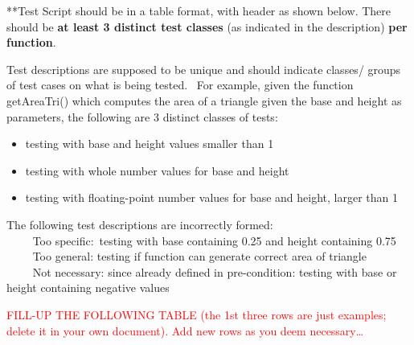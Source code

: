 \documentclass[10pt, letterpaper]{article}
\begin{document}
\begin{flushleft}
    **Test Script should be in a table format, with header as shown below.
    There should be \textbf{at least 3 distinct test classes} (as indicated in
    the description) \textbf{per function}.
\end{flushleft}

\begin{flushleft}
    Test descriptions are supposed to be unique and should indicate classes/
    groups of test cases on what is being tested.  For example, given the 
    function getAreaTri() which computes the area of a triangle given the base
    and height as parameters, the following are 3 distinct classes of tests:
\end{flushleft}

\begin{itemize}[itemsep=-0.2em]
    \item testing with base and height values smaller than 1
    \item testing with whole number values for base and height
    \item testing with floating-point number values for base and height, larger
          than 1
\end{itemize}

\begin{flushleft}
    The following test descriptions are incorrectly formed:\\
          Too specific: testing with base containing 0.25 and height containing
                        0.75\\
          Too general: testing if function can generate correct area of
                       triangle\\
          Not necessary: since already defined in pre-condition: testing with
                         base or height containing negative values
\end{flushleft}

\begin{flushleft}
    \textcolor{red} {
        FILL-UP THE FOLLOWING TABLE (the 1st three rows are just examples; delete
        it in your own document).  Add new rows as you deem necessary…
    }
\end{flushleft}
\end{document}
